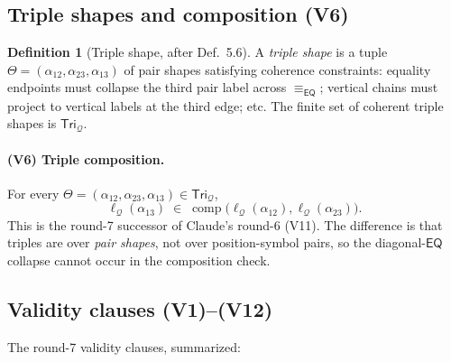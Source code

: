 \documentclass[11pt]{article}
\theoremstyle{definition}
\newtheorem{definition}[theorem]{Definition}
\theoremstyle{remark}
\newcommand{\EQ}{\mathsf{EQ}}
\newcommand{\comp}{\operatorname{comp}}
\newcommand{\Q}{\mathcal Q}
\newcommand{\Tri}{\mathsf{Tri}}
\newcommand{\eqc}{\equiv_{\EQ}}
\begin{document}
\subsection{Triple shapes and composition (V6)}

\begin{definition}[Triple shape, after \cite{GPT55Round7Sketch} Def.~5.6]
A \emph{triple shape} is a tuple $\Theta=(\alpha_{12},\alpha_{23},\alpha_{13})$
of pair shapes satisfying coherence constraints: equality endpoints
must collapse the third pair label across $\eqc$; vertical chains must
project to vertical labels at the third edge; etc.  The finite set of
coherent triple shapes is $\Tri_\Q$.
\end{definition}

\paragraph{(V6) Triple composition.}
For every $\Theta=(\alpha_{12},\alpha_{23},\alpha_{13})\in\Tri_\Q$,
\[
  \ell_\Q(\alpha_{13})\;\in\;\comp\bigl(\ell_\Q(\alpha_{12}),\ell_\Q(\alpha_{23})\bigr).
\]
This is the round-7 successor of Claude's round-6 (V11).  The
difference is that triples are over \emph{pair shapes}, not over
position-symbol pairs, so the diagonal-$\EQ$ collapse cannot occur in
the composition check.

\subsection{Validity clauses (V1)--(V12)}

The round-7 validity clauses, summarized:
\end{document}
